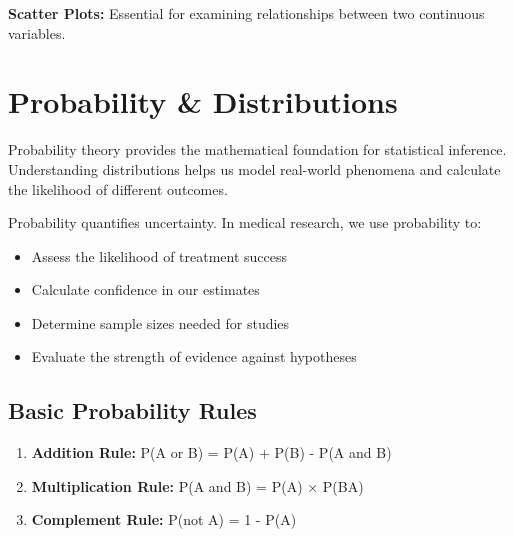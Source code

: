 \documentclass[
  11pt,
  letterpaper,
  oneside]{book}
\providecommand{\tightlist}{%
  \setlength{\itemsep}{0pt}\setlength{\parskip}{0pt}}\usepackage{longtable,booktabs,array}
\begin{document}
\textbf{Scatter Plots:} Essential for examining relationships between
two continuous variables.

\section{Probability \& Distributions}\label{probability-distributions}

Probability theory provides the mathematical foundation for statistical
inference. Understanding distributions helps us model real-world
phenomena and calculate the likelihood of different outcomes.

\begin{tcolorbox}[enhanced jigsaw, left=2mm, opacityback=0, titlerule=0mm, leftrule=.75mm, colbacktitle=quarto-callout-note-color!10!white, title=\textcolor{quarto-callout-note-color}{\faInfo}\hspace{0.5em}{What is Probability?}, breakable, opacitybacktitle=0.6, rightrule=.15mm, colframe=quarto-callout-note-color-frame, toprule=.15mm, bottomrule=.15mm, bottomtitle=1mm, toptitle=1mm, coltitle=black, arc=.35mm, colback=white]

Probability quantifies uncertainty. In medical research, we use
probability to:

\begin{itemize}
\tightlist
\item
  Assess the likelihood of treatment success
\item
  Calculate confidence in our estimates
\item
  Determine sample sizes needed for studies
\item
  Evaluate the strength of evidence against hypotheses
\end{itemize}

\end{tcolorbox}

\subsection{Basic Probability Rules}\label{basic-probability-rules}

\begin{enumerate}
\def\labelenumi{\arabic{enumi}.}
\tightlist
\item
  \textbf{Addition Rule:} P(A or B) = P(A) + P(B) - P(A and B)
\item
  \textbf{Multiplication Rule:} P(A and B) = P(A) × P(B\textbar A)
\item
  \textbf{Complement Rule:} P(not A) = 1 - P(A)
\end{enumerate}
\end{document}
